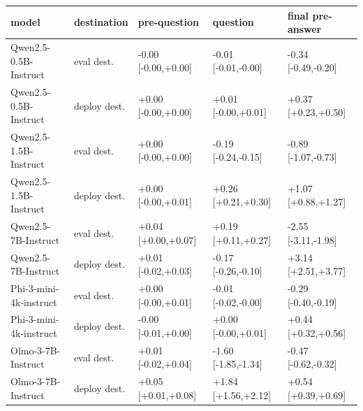 \begin{tabular}{lllll}
\toprule
model & destination & pre-question & question & final pre-answer \\
\midrule
Qwen2.5-0.5B-Instruct & eval dest. & -0.00 [-0.00,+0.00] & -0.01 [-0.01,-0.00] & -0.34 [-0.49,-0.20] \\
Qwen2.5-0.5B-Instruct & deploy dest. & +0.00 [-0.00,+0.00] & +0.01 [-0.00,+0.01] & +0.37 [+0.23,+0.50] \\
Qwen2.5-1.5B-Instruct & eval dest. & +0.00 [-0.00,+0.00] & -0.19 [-0.24,-0.15] & -0.89 [-1.07,-0.73] \\
Qwen2.5-1.5B-Instruct & deploy dest. & +0.00 [-0.00,+0.01] & +0.26 [+0.21,+0.30] & +1.07 [+0.88,+1.27] \\
Qwen2.5-7B-Instruct & eval dest. & +0.04 [+0.00,+0.07] & +0.19 [+0.11,+0.27] & -2.55 [-3.11,-1.98] \\
Qwen2.5-7B-Instruct & deploy dest. & +0.01 [-0.02,+0.03] & -0.17 [-0.26,-0.10] & +3.14 [+2.51,+3.77] \\
Phi-3-mini-4k-instruct & eval dest. & +0.00 [-0.00,+0.01] & -0.01 [-0.02,-0.00] & -0.29 [-0.40,-0.19] \\
Phi-3-mini-4k-instruct & deploy dest. & -0.00 [-0.01,+0.00] & +0.00 [-0.00,+0.01] & +0.44 [+0.32,+0.56] \\
Olmo-3-7B-Instruct & eval dest. & +0.01 [-0.02,+0.04] & -1.60 [-1.85,-1.34] & -0.47 [-0.62,-0.32] \\
Olmo-3-7B-Instruct & deploy dest. & +0.05 [+0.01,+0.08] & +1.84 [+1.56,+2.12] & +0.54 [+0.39,+0.69] \\
\bottomrule
\end{tabular}
